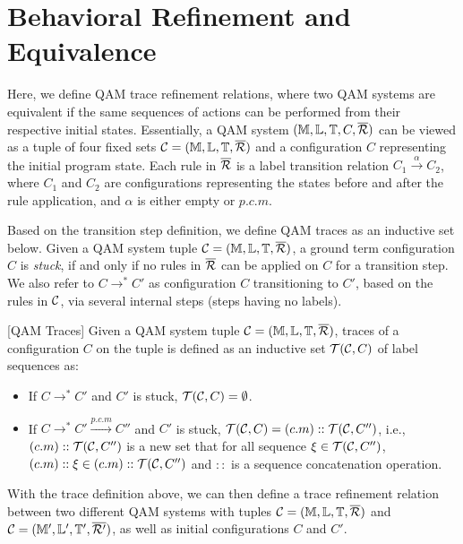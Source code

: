 \section{Behavioral Refinement and Equivalence} \label{sec:refinement}

Here, we define QAM trace refinement relations, where two QAM systems are equivalent if the same sequences of actions can be performed
from their respective initial states.
Essentially, a QAM system $(\mathbb{M},\mathbb{L},\mathbb{T},C,\overline{\mathcal{R}})$
can be viewed as a tuple of four fixed sets $\mathcal{C}=(\mathbb{M},\mathbb{L},\mathbb{T},\overline{\mathcal{R}})$
and a configuration $C$ representing the initial program state.
Each rule in $\overline{\mathcal{R}}$ is a label transition relation $C_1 \xrightarrow{\alpha} C_2$,
where $C_1$ and $C_2$ are configurations representing the states
before and after the rule application, and $\alpha$ is either empty or $p.c.m$.

Based on the transition step definition, we define QAM traces as an inductive set below. Given a QAM system tuple $\mathcal{C}=(\mathbb{M},\mathbb{L},\mathbb{T},\overline{\mathcal{R}})$, a ground term configuration $C$ is \textit{stuck}, if and only if no rules in $\overline{\mathcal{R}}$ can be applied on $C$ for a transition step. We also refer to $C \longrightarrow^* C'$ as configuration $C$ transitioning to $C'$, based on the rules in $\mathcal{C}$, via several internal steps (steps having no labels).

\begin{definition}\label{def:traces}\rm[QAM Traces]
Given a QAM system tuple $\mathcal{C}=(\mathbb{M},\mathbb{L},\mathbb{T},\overline{\mathcal{R}})$, traces of a configuration $C$ on the tuple is defined as an inductive set $\mathcal{T}(\mathcal{C},C)$ of label sequences as:

\begin{itemize}
\item If $C \longrightarrow^* C'$ and $C'$ is stuck, $\mathcal{T}(\mathcal{C},C)=\emptyset$.
\item If $C \longrightarrow^* C' \xrightarrow{p.c.m} C''$ and $C'$ is stuck, $\mathcal{T}(\mathcal{C},C)=(c.m)::\mathcal{T}(\mathcal{C},C'')$, i.e., $(c.m)::\mathcal{T}(\mathcal{C},C'')$ is a new set that for all sequence $\xi \in \mathcal{T}(\mathcal{C},C'')$, $(c.m)::\xi \in (c.m)::\mathcal{T}(\mathcal{C},C'')$ and $::$ is a sequence concatenation operation.
\end{itemize}
\end{definition}

With the trace definition above, we can then define a trace refinement relation between two different QAM systems with tuples $\mathcal{C}=(\mathbb{M},\mathbb{L},\mathbb{T},\overline{\mathcal{R}})$ and $\mathcal{C}=(\mathbb{M}',\mathbb{L}',\mathbb{T}',\overline{\mathcal{R}'})$, as well as initial configurations $C$ and $C'$.


